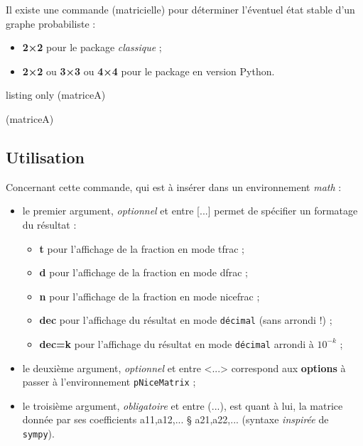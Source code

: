 \documentclass[french,a4paper,11pt]{article}
\newcommand\Cle[1]{{\bfseries\sffamily\textlangle #1\textrangle}}
\newcommand\cmaj[1]{\tcbox[vignetteMaJ]{#1}\xspace}
\begin{document}
\begin{cautionblock}
\cmaj{0.1.4} Il existe une commande (matricielle) pour déterminer l'éventuel état stable d'un graphe probabiliste :

\begin{itemize}
	\item \textbf{2×2} pour le package \textit{classique} ;
	\item \textbf{2×2} ou \textbf{3×3} ou \textbf{4×4} pour le package en version \textsf{Python}.
\end{itemize}
\vspace*{-\baselineskip}\leavevmode
\end{cautionblock}

\begin{PresentationCode}{listing only}
(matriceA)

(matriceA)
\end{PresentationCode}

\subsection{Utilisation}

\begin{tipblock}
Concernant cette commande, qui est à insérer dans un environnement \textit{math} :

\begin{itemize}
	\item le premier argument, \textit{optionnel} et entre \textsf{[...]} permet de spécifier un formatage du résultat :
	\begin{itemize}
		\item \Cle{t} pour l'affichage de la fraction en mode \textsf{tfrac} ;
		\item \Cle{d} pour l'affichage de la fraction en mode \textsf{dfrac} ;
		\item \Cle{n} pour l'affichage de la fraction en mode \textsf{nicefrac} ;
		\item \Cle{dec} pour l'affichage du résultat en mode \texttt{décimal} (sans arrondi !) ;
		\item \Cle{dec=k} pour l'affichage du résultat en mode \texttt{décimal} arrondi à $10^{-k}$ ;
	\end{itemize}
	\item le deuxième argument, \textit{optionnel} et entre \textsf{<...>} correspond aux \Cle{options} à passer à l'environnement \texttt{pNiceMatrix} ;
	\item le troisième argument, \textit{obligatoire} et entre \textsf{(...)}, est quant à lui, la matrice donnée par ses coefficients \textsf{a11,a12,... § a21,a22,...} (syntaxe \textit{inspirée} de \texttt{sympy}).
\end{itemize}
\vspace*{-\baselineskip}\leavevmode
\end{tipblock}
\end{document}
